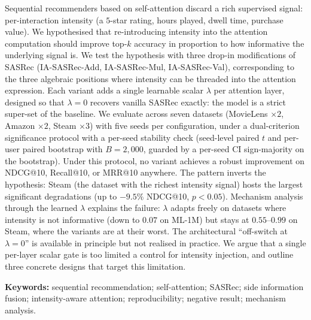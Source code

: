 {\small\noindent Sequential recommenders based on self-attention discard a
rich supervised signal: per-interaction intensity (a $5$-star
rating, hours played, dwell time, purchase value). We hypothesised
that re-introducing intensity into the attention computation should
improve top-$k$ accuracy in proportion to how informative the
underlying signal is. We test the hypothesis with three drop-in
modifications of SASRec (IA-SASRec-Add, IA-SASRec-Mul, IA-SASRec-Val),
corresponding to the three algebraic positions where intensity
can be threaded into the attention expression. Each variant adds a
single learnable scalar $\lambda$ per attention layer, designed so
that $\lambda{=}0$ recovers vanilla SASRec exactly: the model is a
strict super-set of the baseline. We evaluate across seven datasets (MovieLens
$\times2$, Amazon $\times2$, Steam $\times3$) with five seeds per
configuration, under a dual-criterion significance protocol with a per-seed
stability check (seed-level paired $t$ and per-user paired bootstrap with
$B{=}2{,}000$, guarded by a per-seed CI sign-majority on the bootstrap).
Under this protocol, no variant achieves a robust improvement on NDCG@10,
Recall@10, or MRR@10 anywhere. The pattern
inverts the hypothesis: Steam (the dataset with the richest
intensity signal) hosts the largest significant degradations (up to
$-9.5\%$ NDCG@10, $p<0.05$). Mechanism analysis through the learned
$\lambda$ explains the failure: $\lambda$ adapts freely on datasets
where intensity is not informative (down to $0.07$ on ML-1M) but stays
at $0.55$--$0.99$ on Steam, where the variants are at their worst.
The architectural ``off-switch at $\lambda{=}0$'' is available in
principle but not realised in practice. We argue that a single
per-layer scalar gate is too limited a control for intensity
injection, and outline three concrete designs that target this
limitation.

\par\smallskip
\noindent\textbf{Keywords:} sequential recommendation; self-attention; SASRec; side information fusion; intensity-aware attention; reproducibility; negative result; mechanism analysis.}
